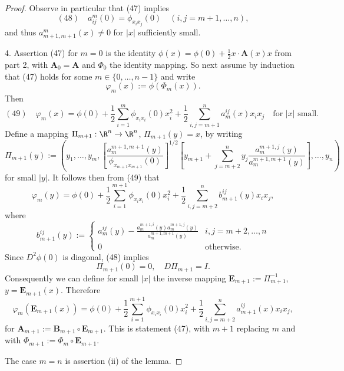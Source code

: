 \begin{proof}
Observe in particular that (47) implies
$$(48) \quad a_{ij}^m(0) = \phi_{x_i x_j}(0) \quad (i,j = m+1,\ldots,n),$$
and thus $a_{m+1,m+1}^m(x) \neq 0$ for $|x|$ sufficiently small.

4. Assertion (47) for $m = 0$ is the identity $\phi(x) = \phi(0) + \frac{1}{2}x\cdot \mathbf{A}(x)x$ from part 2, with $\mathbf{A}_0 = \mathbf{A}$ and $\Phi_0$ the identity mapping. So next assume by induction that (47) holds for some $m \in \{0,\ldots,n-1\}$ and write
$$\varphi_m(x) := \phi(\Phi_m(x)).$$
Then
$$(49) \quad \varphi_m(x) = \phi(0) + \frac{1}{2}\sum_{i=1}^m \phi_{x_i x_i}(0)x_i^2 + \frac{1}{2}\sum_{i,j=m+1}^n a_{m}^{ij}(x)x_i x_j \quad \text{for } |x| \text{ small}.$$
Define a mapping $\Pi_{m+1} : \R^n \to \R^n$, $\Pi_{m+1}(y) = x$, by writing
$$\Pi_{m+1}(y) := \left(y_1,\ldots,y_m, \left[\frac{a_m^{m+1,m+1}(y)}{\phi_{x_{m+1}x_{m+1}}(0)}\right]^{1/2}\left[y_{m+1} + \sum_{j=m+2}^n y_j\frac{a_m^{m+1,j}(y)}{a_m^{m+1,m+1}(y)}\right],\ldots,y_n\right)$$
for small $|y|$. It follows then from (49) that
$$\varphi_m(y) = \phi(0) + \frac{1}{2}\sum_{i=1}^{m+1} \phi_{x_i x_i}(0)x_i^2 + \frac{1}{2}\sum_{i,j=m+2}^n b_{m+1}^{ij}(y)x_i x_j,$$
where
$$b_{m+1}^{ij}(y) := \begin{cases}
a_m^{ij}(y) - \frac{a_m^{m+1,i}(y)a_m^{m+1,j}(y)}{a_m^{m+1,m+1}(y)} & i,j = m+2,\ldots,n\\
0 & \text{otherwise}.
\end{cases}$$
Since $D^2\phi(0)$ is diagonal, (48) implies
$$\Pi_{m+1}(0) = 0, \quad D\Pi_{m+1} = I.$$
Consequently we can define for small $|x|$ the inverse mapping $\mathbf{E}_{m+1} := \Pi_{m+1}^{-1}$, $y = \mathbf{E}_{m+1}(x)$. Therefore
$$\varphi_m(\mathbf{E}_{m+1}(x)) = \phi(0) + \frac{1}{2}\sum_{i=1}^{m+1} \phi_{x_i x_i}(0)x_i^2 + \frac{1}{2}\sum_{i,j=m+2}^n a_{m+1}^{ij}(x)x_i x_j,$$
for $\mathbf{A}_{m+1} := \mathbf{B}_{m+1} \circ \mathbf{E}_{m+1}$. This is statement (47), with $m+1$ replacing $m$ and with $\Phi_{m+1} := \Phi_m \circ \mathbf{E}_{m+1}$.

The case $m = n$ is assertion (ii) of the lemma.
\end{proof}

